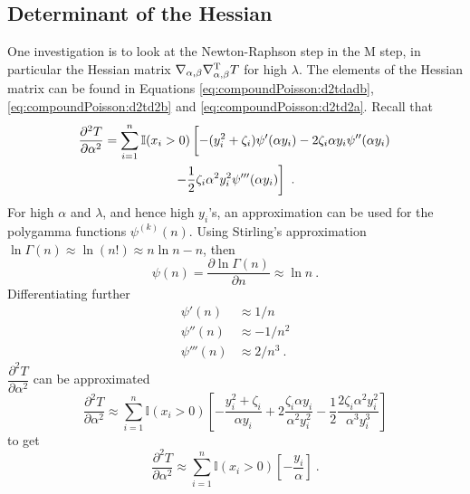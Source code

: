\subsection{Determinant of the Hessian}

One investigation is to look at the Newton-Raphson step in the M step, in particular the Hessian matrix $\nabla_{\alpha,\beta}\nabla_{\alpha,\beta}^\textup{T} T$ for high $\lambda$. The elements of the Hessian matrix can be found in Equations \eqref{eq:compoundPoisson:d2tdadb}, \eqref{eq:compoundPoisson:d2td2b} and \eqref{eq:compoundPoisson:d2td2a}. Recall that
\begin{multline*}
  \frac{\partial^2 T}{\partial \alpha^2} = 
  \sum_{i=1}^n\mathbb{I}(x_i>0)\left[
    -(y_i^2+\zeta_i)\psi'(\alpha y_i) - 2\zeta_i\alpha y_i\psi''(\alpha y_i)
    \vphantom{\frac{1}{2}}
  \right.
  \\
  \left.  
    -\frac{1}{2}\zeta_i\alpha^2y_i^2\psi'''(\alpha y_i)
  \right]
  \ .
\end{multline*}
For high $\alpha$ and $\lambda$, and hence high $y_i$'s, an approximation can be used for the polygamma functions $\psi^{(k)}(n)$. Using Stirling's approximation $\ln\Gamma(n)\approx\ln(n!)\approx n\ln n-n$, then
\begin{equation}
  \psi(n) = \frac{\partial\ln\Gamma(n)}{\partial n} \approx \ln n
  \ .
\end{equation}
Differentiating further
\begin{align}
  \psi'(n) &\approx 1/n \\
  \psi''(n) & \approx -1/n^2 \\
  \psi'''(n) & \approx 2/n^3
  \ .
\end{align}
$\dfrac{\partial^2T}{\partial\alpha^2}$ can be approximated
\begin{equation*}
  \frac{\partial^2 T}{\partial \alpha^2} \approx 
  \sum_{i=1}^n\mathbb{I}(x_i>0)
  \left[
    -\frac{y_i^2+\zeta_i}{\alpha y_i} + 2\frac{\zeta_i\alpha y_i}{\alpha^2 y_i^2}
    -\frac{1}{2}\frac{2\zeta_i\alpha^2y_i^2}{\alpha^3 y_i^3}
  \right]
\end{equation*}
to get
\begin{equation}
  \frac{\partial^2 T}{\partial \alpha^2} \approx 
  \sum_{i=1}^n\mathbb{I}(x_i>0)
  \left[
    -\frac{y_i}{\alpha}
  \right]
  \ .
\end{equation}

